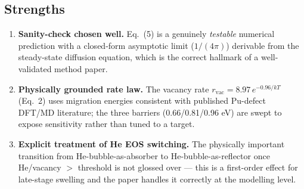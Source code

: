 \documentclass[11pt]{article}
\begin{document}
\subsection{Strengths}
\begin{enumerate}
  \item \textbf{Sanity-check chosen well.} Eq.~(5) is a genuinely
        \emph{testable} numerical prediction with a closed-form
        asymptotic limit ($1/(4\pi)$) derivable from the steady-state
        diffusion equation, which is the correct hallmark of a
        well-validated method paper.
  \item \textbf{Physically grounded rate law.} The vacancy rate
        $r_{\mathrm{vac}} = 8.97\,e^{-0.96/kT}$ (Eq.~2) uses migration
        energies consistent with published Pu-defect DFT/MD literature; the
        three barriers (0.66/0.81/0.96 eV) are swept to expose sensitivity
        rather than tuned to a target.
  \item \textbf{Explicit treatment of He EOS switching.} The physically
        important transition from He-bubble-as-absorber to
        He-bubble-as-reflector once He/vacancy $>$ threshold is not glossed
        over --- this is a first-order effect for late-stage swelling and
        the paper handles it correctly at the modelling level.
\end{enumerate}
\end{document}
